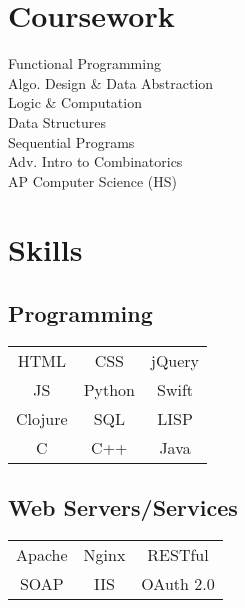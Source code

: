 \documentclass[letterpaper]{deedy-resume} %
\begin{document}
\begin{minipage}[t]{0.33\textwidth}

\section{Coursework}

Functional Programming \\
Algo. Design \& Data Abstraction \\
Logic \& Computation \\
Data Structures \\
Sequential Programs \\
Adv. Intro to Combinatorics \\
AP Computer Science (HS)

\sectionspace %


\section{Skills}

\vspace{2mm}

\subsection{Programming}

\begin{tabular}{ c c c }
HTML    & CSS    & jQuery \\
JS      & Python & Swift    \\
Clojure & SQL    & LISP   \\
C       & C++    & Java \\
\end{tabular}

\vspace{4mm}

\subsection{Web Servers/Services}

\begin{tabular}{ c c c }
  Apache & Nginx & RESTful \\
  SOAP & IIS & OAuth 2.0
\end{tabular}


\end{minipage}
\end{document}
